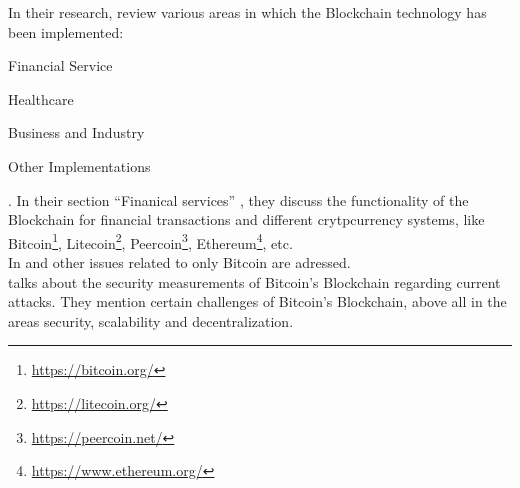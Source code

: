 In their research, \citet{2017_Tama} review various areas in which the Blockchain technology has been implemented:
\begin{enumerate*}[label={\Alph*)},font={\color{red!50!black}\bfseries}]
\item Financial Service
\item Healthcare
\item Business and Industry
\item Other Implementations
\end{enumerate*}.
In their section \enquote{Finanical services} \citep[chap. 3.A]{2017_Tama}, they discuss the functionality of the Blockchain for financial transactions and different crytpcurrency systems, like Bitcoin\footnote{\url{https://bitcoin.org/}}, Litecoin\footnote{\url{https://litecoin.org/}}, Peercoin\footnote{\url{https://peercoin.net/}}, Ethereum\footnote{\url{https://www.ethereum.org/}}, etc.\\
In \cite{2016_Karame} and \cite{2018_Conti} other issues related to only Bitcoin are adressed.\\
\citet{2016_Karame} talks about the security measurements of Bitcoin's Blockchain regarding current attacks. They mention certain challenges of Bitcoin's Blockchain, above all in the areas security, scalability and decentralization.
